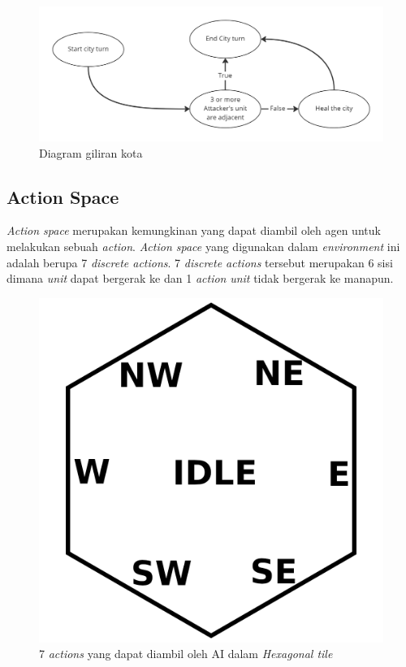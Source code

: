 \begin{figure}[H]
  \centering
    \includegraphics[scale=0.27]{gambar/city_turn.jpg}
    \caption{Diagram giliran kota}
    \label{fig:cityTurnDiagram}
\end{figure}

\subsection{Action Space}
\emph{Action space} merupakan kemungkinan yang dapat diambil oleh agen untuk melakukan sebuah \emph{action}.
\emph{Action space} yang digunakan dalam \emph{environment} ini adalah berupa 7 \emph{discrete actions}.
7 \emph{discrete actions} tersebut merupakan 6 sisi dimana \emph{unit} dapat bergerak ke dan 1 \emph{action} \emph{unit} tidak bergerak ke manapun.

\begin{figure}[H]
  \centering
    \includegraphics[scale=0.6]{gambar/hex_action.png}
    \caption{7 \emph{actions} yang dapat diambil oleh AI dalam \emph{Hexagonal tile}}
    \label{fig:hex_action}
\end{figure}

